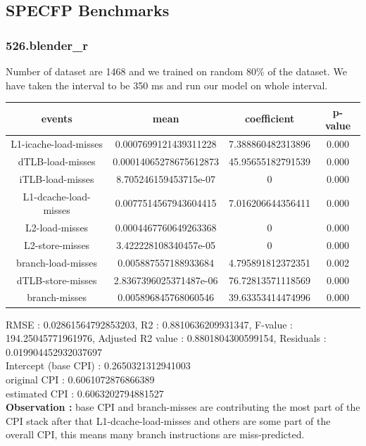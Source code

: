 \documentclass[10pt, letterpaper, IEEEtran, tikz,border=5,a4paper,fleqn]{article}
\begin{document}
\subsection{SPECFP Benchmarks}

\subsubsection{526.blender\_r}

Number of dataset are 1468 and we trained on random 80\% of the dataset. We have taken the interval to be 350 ms and run our model on whole interval.
\begin{center}
\begin{tabular}{||c c c c||}
 \hline
 \textbf{events} & \textbf{mean} & \textbf{coefficient} & \textbf{p-value}\\ [0.5ex]
 \hline\hline
 L1-icache-load-misses & 0.0007699121439311228 & 7.388860482313896 & 0.000\\
 \hline
 dTLB-load-misses & 0.00014065278675612873 & 45.95655182791539 & 0.000\\
 \hline
 iTLB-load-misses & 8.705246159453715e-07 & 0 & 0.000\\
 \hline
 L1-dcache-load-misses & 0.0077514567943604415 & 7.016206644356411 & 0.000\\
 \hline
 L2-load-misses & 0.0004467760649263368 & 0 & 0.000\\
 \hline
 L2-store-misses & 3.422228108340457e-05 & 0 & 0.000\\
 \hline
 branch-load-misses & 0.005887557188933684 & 4.795891812372351 & 0.002\\
 \hline
 dTLB-store-misses & 2.8367396025371487e-06 & 76.72813571118569 & 0.000\\
 \hline
 branch-misses & 0.005896845768060546 & 39.63353414474996 & 0.000\\
 \hline
\end{tabular}
\end{center}
RMSE : 0.02861564792853203,
R2 : 0.8810636209931347,
F-value : 194.25045771961976,
Adjusted R2 value : 0.8801804300599154,
Residuals : 0.019904452932037697\\

\noindent Intercept (base CPI) : 0.2650321312941003\\
original CPI : 0.6061072876866389\\
estimated CPI : 0.6063202794881527\\

\noindent \textbf{Observation :} base CPI and branch-misses are contributing the most part of the CPI stack after that L1-dcache-load-misses and others are some part of the overall CPI, this means many branch instructions are miss-predicted.
\end{document}
